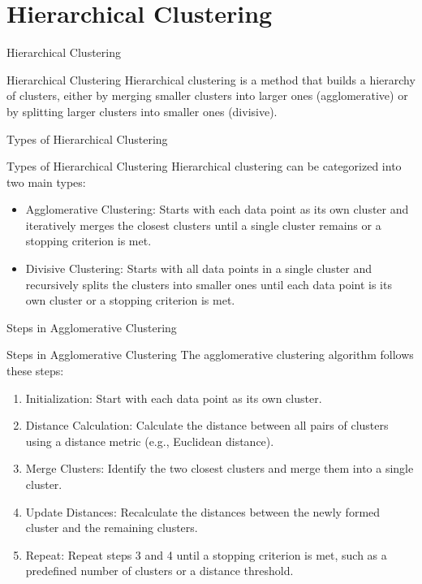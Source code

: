\documentclass[hyperref={pdfpagelabels=false},aspectratio=169]{beamer}
\begin{document}
\section{Hierarchical Clustering}
\label{sec:org73aeef3}
\begin{frame}[label={sec:org4bd7be7}]{Hierarchical Clustering}
\begin{block}{Hierarchical Clustering}
\pause
\alert{Hierarchical clustering} is a method that builds a hierarchy of clusters, either by merging smaller clusters into larger ones (agglomerative) or by splitting larger clusters into smaller ones (divisive).
\end{block}
\end{frame}
\begin{frame}[label={sec:org5f94fa2}]{Types of Hierarchical Clustering}
\begin{block}{Types of Hierarchical Clustering}
\pause
Hierarchical clustering can be categorized into two main types:
\begin{itemize}[<+->]
\item \alert{Agglomerative Clustering}: Starts with each data point as its own cluster and iteratively merges the closest clusters until a single cluster remains or a stopping criterion is met.
\item \alert{Divisive Clustering}: Starts with all data points in a single cluster and recursively splits the clusters into smaller ones until each data point is its own cluster or a stopping criterion is met.
\end{itemize}
\end{block}
\end{frame}
\begin{frame}[label={sec:org5f397ee}]{Steps in Agglomerative Clustering}
\begin{block}{Steps in Agglomerative Clustering}
\pause
The agglomerative clustering algorithm follows these steps:
\begin{enumerate}[<+->]
\item \alert{\alert{Initialization}}: Start with each data point as its own cluster.
\item \alert{\alert{Distance Calculation}}: Calculate the distance between all pairs of clusters using a distance metric (e.g., Euclidean distance).
\item \alert{\alert{Merge Clusters}}: Identify the two closest clusters and merge them into a single cluster.
\item \alert{\alert{Update Distances}}: Recalculate the distances between the newly formed cluster and the remaining clusters.
\item \alert{\alert{Repeat}}: Repeat steps 3 and 4 until a stopping criterion is met, such as a predefined number of clusters or a distance threshold.
\end{enumerate}
\end{block}
\end{frame}
\end{document}
